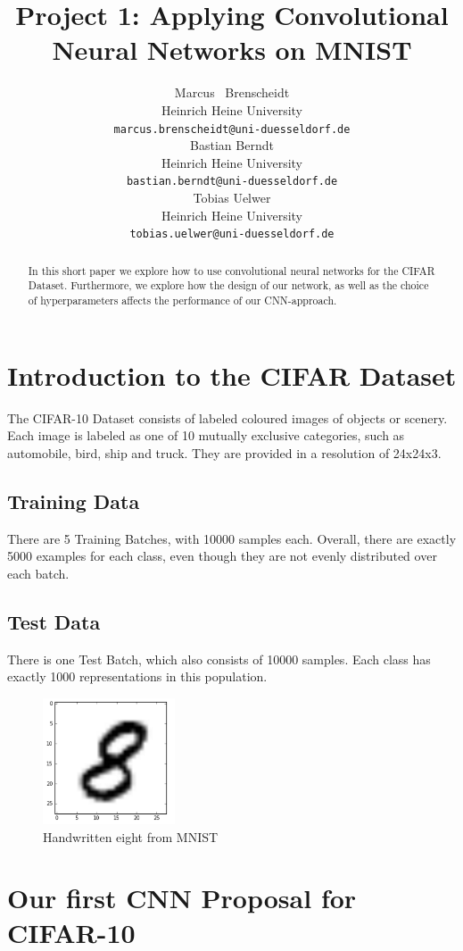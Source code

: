 \documentclass{article}
\title{Project 1: Applying Convolutional Neural Networks on MNIST}
\author{
  Marcus ~Brenscheidt \\
  Heinrich Heine University\\
  \texttt{marcus.brenscheidt@uni-duesseldorf.de} \\
  \And
  Bastian Berndt \\
  Heinrich Heine University\\
  \texttt{bastian.berndt@uni-duesseldorf.de} \\
  \And
  Tobias Uelwer \\
  Heinrich Heine University\\
  \texttt{tobias.uelwer@uni-duesseldorf.de} \\
}
\begin{document}

\maketitle

\begin{abstract}
  In this short paper we explore how to use convolutional neural networks for the CIFAR Dataset. Furthermore, we explore how the design of our network, as well as the choice of hyperparameters affects the performance of our CNN-approach.
\end{abstract}

\section{Introduction to the CIFAR Dataset}
The CIFAR-10 Dataset consists of labeled coloured images of objects or scenery. Each image is labeled as one of 10 mutually exclusive categories, such as automobile, bird, ship and truck. They are provided in a resolution of 24x24x3. 
\subsection{Training Data}
There are 5 Training Batches, with 10000 samples each. Overall, there are exactly 5000 examples for each class, even though they are not evenly distributed over each batch.
\subsection{Test Data}
There is one Test Batch, which also consists of 10000 samples. Each class has exactly 1000 representations in this population.
\begin{figure}[h]
\centering
\includegraphics[width=0.35\textwidth]{imgs/8.png}
\caption{Handwritten eight from MNIST}\label{acht}
\end{figure}

\section{Our first CNN Proposal for CIFAR-10}
\end{document}
